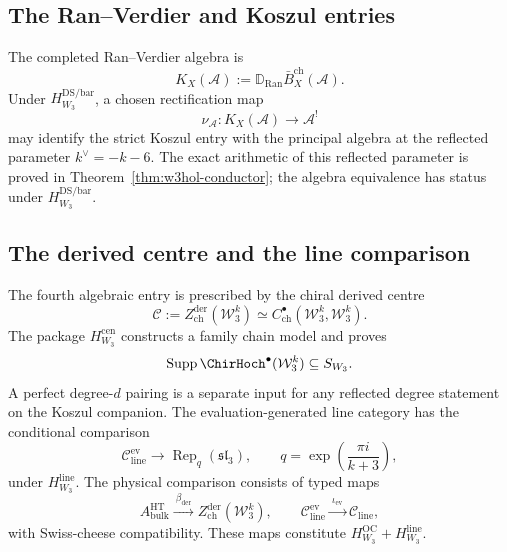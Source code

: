 \subsection{The Ran--Verdier and Koszul entries}
\label{subsec:w3hol-A-dual}

The completed Ran--Verdier algebra is
\[
K_X(\mathcal A)
:=\mathbb D_{\operatorname{Ran}}
\bar B_X^{\mathrm{ch}}(\mathcal A).
\]
Under \(H_{W_3}^{\mathrm{DS/bar}}\), a chosen rectification map
\[
\nu_{\mathcal A}\colon
K_X(\mathcal A)\longrightarrow\mathcal A^!
\]
may identify the strict Koszul entry with the principal algebra at
the reflected parameter \(k^\vee=-k-6\).  The exact arithmetic of
this reflected parameter is proved in
Theorem~\ref{thm:w3hol-conductor}; the algebra equivalence has status
\ClaimStatusConditional under \(H_{W_3}^{\mathrm{DS/bar}}\).

\subsection{The derived centre and the line comparison}
\label{subsec:w3hol-C}

The fourth algebraic entry is prescribed by the chiral derived centre
\begin{equation}\label{eq:w3hol-derived-centre}
\mathcal C
:=Z_{\mathrm{ch}}^{\mathrm{der}}(\mathcal W_3^k)
\simeq
C_{\mathrm{ch}}^\bullet(\mathcal W_3^k,\mathcal W_3^k).
\end{equation}
The package \(H_{W_3}^{\mathrm{cen}}\) constructs a family chain model
and proves
\[
\operatorname{Supp}
\ChirHoch^\bullet(\mathcal W_3^k)
\subseteq S_{W_3}.
\]
A perfect degree-$d$ pairing is a separate input for any reflected
degree statement on the Koszul companion.
The evaluation-generated line category has the conditional comparison
\begin{equation}\label{eq:w3hol-line-evaluation-category}
\mathcal C_{\mathrm{line}}^{\mathrm{ev}}
\longrightarrow
\operatorname{Rep}_q(\mathfrak{sl}_3),
\qquad q=\exp\!\left(\frac{\pi i}{k+3}\right),
\end{equation}
under \(H_{W_3}^{\mathrm{line}}\).  The physical comparison consists
of typed maps
\begin{equation}\label{eq:w3hol-typed-comparison-maps}
A_{\mathrm{bulk}}^{\mathrm{HT}}
\xrightarrow{\ \beta_{\mathrm{der}}\ }
Z_{\mathrm{ch}}^{\mathrm{der}}(\mathcal W_3^k),
\qquad
\mathcal C_{\mathrm{line}}^{\mathrm{ev}}
\xrightarrow{\ \iota_{\mathrm{ev}}\ }
\mathcal C_{\mathrm{line}},
\end{equation}
with Swiss-cheese compatibility.  These maps constitute
\(H_{W_3}^{\mathrm{OC}}+H_{W_3}^{\mathrm{line}}\).

